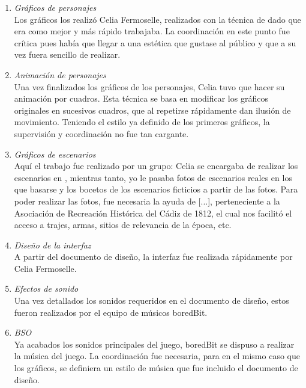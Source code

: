 \begin{enumerate}
\begin{enumerate}
\begin{enumerate}
\item \emph{Gráficos de personajes} \hfill \\
Los gráficos los realizó Celia Fermoselle, realizados con la técnica de  dado que era como mejor y más rápido trabajaba. La coordinación en este punto fue crítica pues había que llegar a una estética que gustase al público y que a su vez fuera sencillo de realizar.

\item \emph{Animación de personajes} \hfill \\
Una vez finalizados los gráficos de los personajes, Celia tuvo que hacer su animación por cuadros. Esta técnica se basa en modificar los gráficos originales en sucesivos cuadros, que al repetirse rápidamente dan ilusión de movimiento. Teniendo el estilo ya definido de los primeros gráficos, la supervisión y coordinación no fue tan cargante.

\item \emph{Gráficos de escenarios} \hfill \\
Aquí el trabajo fue realizado por un grupo: Celia se encargaba de realizar los escenarios en , mientras tanto, yo le pasaba fotos de escenarios reales en los que basarse y los bocetos de los escenarios ficticios a partir de las fotos. Para poder realizar las fotos, fue necesaria la ayuda de [...], perteneciente a la Asociación de Recreación Histórica del Cádiz de 1812, el cual nos facilitó el acceso a trajes, armas, sitios de relevancia de la época, etc.

\item \emph{Diseño de la interfaz} \hfill \\
A partir del documento de diseño, la interfaz fue realizada rápidamente por Celia Fermoselle.

\item \emph{Efectos de sonido} \hfill \\
Una vez detallados los sonidos requeridos en el documento de diseño, estos fueron realizados por el equipo de músicos boredBit.

\item \emph{BSO} \hfill \\
Ya acabados los sonidos principales del juego, boredBit se dispuso a realizar la música del juego. La coordinación fue necesaria, para en el mismo caso que los gráficos, se definiera un estilo de música que fue incluido el documento de diseño.



\end{enumerate}
\end{enumerate}
\end{enumerate}
